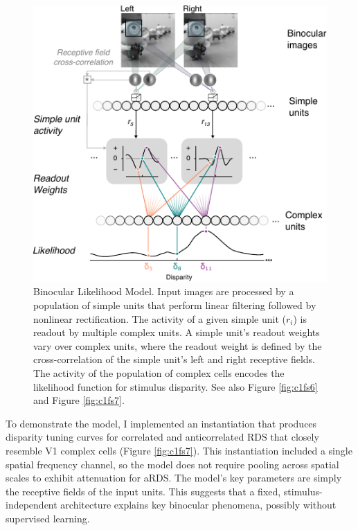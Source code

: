 \begin{figure}[!h]
  \centering
  \includegraphics{chapter1/chapter1-figs/Fig7.pdf}
  \caption[Binocular Likelihood Model.]{Binocular Likelihood Model. Input images are processed by a population of simple units that perform linear filtering followed by nonlinear rectification. The activity of a given simple unit ($r_i$) is readout by multiple complex units. A simple unit's readout weights vary over complex units, where the readout weight is defined by the cross-correlation of the simple unit's left and right receptive fields. The activity of the population of complex cells encodes the likelihood function for stimulus disparity. See also Figure \ref{fig:c1fs6} and Figure \ref{fig:c1fs7}.}
  \label{fig:c1f7}
\end{figure}

To demonstrate the model, I implemented an instantiation that produces disparity tuning curves for correlated and anticorrelated RDS that closely resemble V1 complex cells (Figure \ref{fig:c1fs7}). This instantiation included a single spatial frequency channel, so the model does not require pooling across spatial scales to exhibit attenuation for aRDS. The model's key parameters are simply the receptive fields of the input units. This suggests that a fixed, stimulus-independent architecture explains key binocular phenomena, possibly without supervised learning.  

